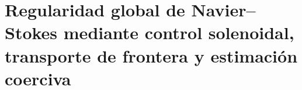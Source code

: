 \chapter{Regularidad global de Navier--Stokes mediante control solenoidal, transporte de frontera y estimación coerciva}
\begingroup
\renewcommand{\chapter}[2][]{}%

\endgroup

\chapter{Existencia cuántica y brecha de masa de Yang--Mills mediante coercividad de calibre y positividad espectral}
\begingroup
\renewcommand{\chapter}[2][]{}%

\endgroup


\chapter{Realización algebraica de clases de Hodge mediante proyectores cohomológicos compatibles y descenso racional}
\begingroup
\renewcommand{\chapter}[2][]{}%

\endgroup

\chapter{Rango, regulador y término principal de Birch--Swinnerton--Dyer mediante memoria determinantal de la familia aritmética}
\begingroup
\renewcommand{\chapter}[2][]{}%

\endgroup

\chapter{Dominios, operadores, naturalidad y certificados de las realizaciones terminales del continuo}
\begingroup
\renewcommand{\chapter}[2][]{}%

\endgroup

